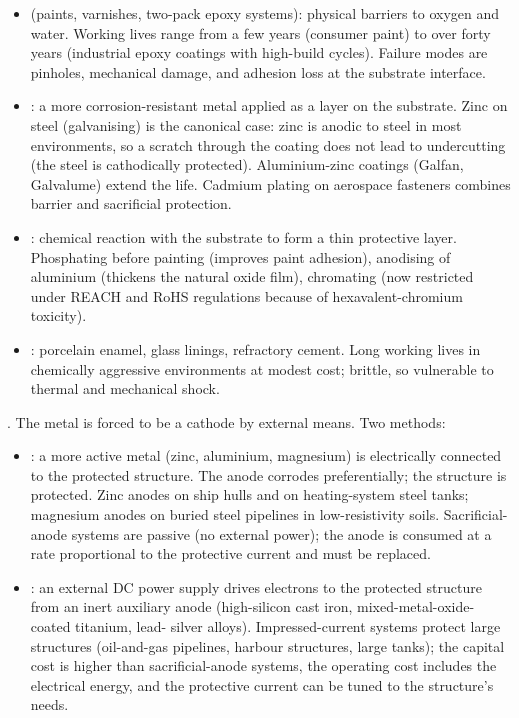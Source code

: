 \begin{itemize}[leftmargin=*]
\item {} (paints, varnishes, two-pack epoxy
  systems): physical barriers to oxygen and water. Working lives
  range from a few years (consumer paint) to over forty years
  (industrial epoxy coatings with high-build cycles). Failure modes
  are pinholes, mechanical damage, and adhesion loss at the substrate
  interface.
\item {}: a more corrosion-resistant metal
  applied as a layer on the substrate. Zinc on steel (galvanising)
  is the canonical case: zinc is anodic to steel in most environments,
  so a scratch through the coating does not lead to undercutting (the
  steel is cathodically protected). Aluminium-zinc coatings (Galfan,
  Galvalume) extend the life. Cadmium plating on aerospace fasteners
  combines barrier and sacrificial protection.
\item {}: chemical reaction with the
  substrate to form a thin protective layer. Phosphating before
  painting (improves paint adhesion), anodising of aluminium (thickens
  the natural oxide film), chromating (now restricted under REACH and
  RoHS regulations because of hexavalent-chromium toxicity).
\item {}: porcelain enamel, glass linings,
  refractory cement. Long working lives in chemically aggressive
  environments at modest cost; brittle, so vulnerable to thermal and
  mechanical shock.
\end{itemize}

. The metal is forced to be a cathode by
external means. Two methods:

\begin{itemize}[leftmargin=*]
\item {}: a more active metal (zinc,
  aluminium, magnesium) is electrically connected to the protected
  structure. The anode corrodes preferentially; the structure is
  protected. Zinc anodes on ship hulls and on heating-system steel
  tanks; magnesium anodes on buried steel pipelines in low-resistivity
  soils. Sacrificial-anode systems are passive (no external power);
  the anode is consumed at a rate proportional to the protective
  current and must be replaced.
\item {}: an external DC power supply drives
  electrons to the protected structure from an inert auxiliary anode
  (high-silicon cast iron, mixed-metal-oxide-coated titanium, lead-
  silver alloys). Impressed-current systems protect large structures
  (oil-and-gas pipelines, harbour structures, large tanks); the
  capital cost is higher than sacrificial-anode systems, the operating
  cost includes the electrical energy, and the protective current
  can be tuned to the structure's needs.
\end{itemize}

